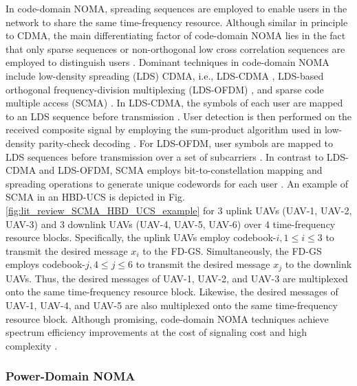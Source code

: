In code-domain NOMA, spreading sequences are employed to enable users in the network to share the same time-frequency resource. Although similar in principle to CDMA, the main differentiating factor of code-domain NOMA lies in the fact that only sparse sequences or non-orthogonal low cross correlation sequences are employed to distinguish users \cite{islam2017power,dai2018survey}. Dominant techniques in code-domain NOMA include low-density spreading (LDS) CDMA, i.e., LDS-CDMA \cite{hoshyar2008novel,razavi2011information,islam2017power,dai2018survey}, LDS-based orthogonal frequency-division multiplexing (LDS-OFDM) \cite{hoshyar2010lds,al2014uplink,islam2017power,dai2018survey}, and sparse code multiple access (SCMA) \cite{islam2017power,dai2018survey,nikopour2013sparse,mu2015fixed,du2016fast}. In LDS-CDMA, the symbols of each user are mapped to an LDS sequence before transmission \cite{dai2018survey,hoshyar2008novel}. User detection is then performed on the received composite signal by employing the sum-product algorithm used in low-density parity-check decoding \cite{hoshyar2008novel}. For LDS-OFDM, user symbols are mapped to LDS sequences before transmission over a set of subcarriers \cite{islam2017power,dai2018survey}. In contrast to LDS-CDMA and LDS-OFDM, SCMA employs bit-to-constellation mapping and spreading operations to generate unique codewords for each user \cite{islam2017power,dai2018survey,nikopour2013sparse}. An example of SCMA in an HBD-UCS is depicted in Fig. \ref{fig:lit_review_SCMA_HBD_UCS_example} for 3 uplink UAVs (UAV-1, UAV-2, UAV-3) and 3 downlink UAVs (UAV-4, UAV-5, UAV-6) over 4 time-frequency resource blocks. Specifically, the uplink UAVs employ codebook-$i, 1 \leq i \leq 3$ to transmit the desired message $x_i$ to the FD-GS. Simultaneously, the FD-GS employs codebook-$j, 4 \leq j \leq 6$ to transmit the desired message $x_j$ to the downlink UAVs. Thus, the desired messages of UAV-1, UAV-2, and UAV-3 are multiplexed onto the same time-frequency resource block. Likewise, the desired messages of UAV-1, UAV-4, and UAV-5 are also multiplexed onto the same time-frequency resource block. Although promising, code-domain NOMA techniques achieve spectrum efficiency improvements at the cost of signaling cost and high complexity \cite{dai2018survey}.

\subsubsection{Power-Domain NOMA}

